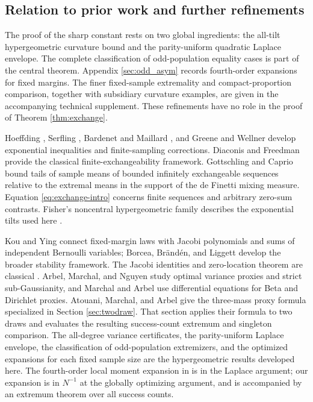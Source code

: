 \documentclass[11pt,a4paper]{article}
\begin{document}
\subsection{Relation to prior work and further refinements}
The proof of the sharp constant rests on two global ingredients: the all-tilt hypergeometric curvature bound and the parity-uniform quadratic Laplace envelope. The complete classification of odd-population equality cases is part of the central theorem. Appendix \ref{sec:odd_asym} records fourth-order expansions for fixed margins. The finer fixed-sample extremality and compact-proportion comparison, together with subsidiary curvature examples, are given in the accompanying technical supplement. These refinements have no role in the proof of Theorem \ref{thm:exchange}.

Hoeffding \cite{Hoeffding}, Serfling \cite{Serfling}, Bardenet and Maillard \cite{BardenetMaillard}, and Greene and Wellner \cite{GreeneWellner} develop exponential inequalities and finite-sampling corrections. Diaconis and Freedman \cite{DiaconisFreedman} provide the classical finite-exchangeability framework. Gottschling and Caprio \cite{GottschlingCaprio} bound tails of sample means of bounded infinitely exchangeable sequences relative to the extremal means in the support of the de Finetti mixing measure. Equation \eqref{eq:exchange-intro} concerns finite sequences and arbitrary zero-sum contrasts. Fisher's noncentral hypergeometric family describes the exponential tilts used here \cite{Fog}.

Kou and Ying \cite{Kou} connect fixed-margin laws with Jacobi polynomials and sums of independent Bernoulli variables; Borcea, Br\"and\'en, and Liggett \cite{BBL} develop the broader stability framework. The Jacobi identities and zero-location theorem are classical \cite[Chapter IV and Section 6.7]{Szego}. Arbel, Marchal, and Nguyen \cite{ArbelMarchalNguyen} study optimal variance proxies and strict sub-Gaussianity, and Marchal and Arbel \cite{MarchalArbel} use differential equations for Beta and Dirichlet proxies. Atouani, Marchal, and Arbel \cite[Theorem 3.2 and Corollary 3.3]{AtouaniMarchalArbel} give the three-mass proxy formula specialized in Section \ref{sec:twodraw}. That section applies their formula to two draws and evaluates the resulting success-count extremum and singleton comparison. The all-degree variance certificates, the parity-uniform Laplace envelope, the classification of odd-population extremizers, and the optimized expansions for each fixed sample size are the hypergeometric results developed here. The fourth-order local moment expansion in \cite[Remark 3.6]{AtouaniMarchalArbel} is in the Laplace argument; our expansion is in $N^{-1}$ at the globally optimizing argument, and is accompanied by an extremum theorem over all success counts.
\end{document}
